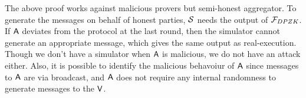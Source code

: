  The above proof works against malicious provers but semi-honest aggregator. To generate the messages on behalf of honest parties, $\mathcal{S}$ needs the output of $\mathcal{F}_{DPZK}$. If $\mathsf{A}$ deviates from the protocol at the last round, then the simulator cannot generate an appropriate message, which gives the same output as real-execution. Though we don't have a simulator when $\mathsf{A}$ is malicious, we do not have an attack either. Also, it is possible to identify the malicious behavoiur of $\mathsf{A}$ since messages to $\mathsf{A}$ are via broadcast, and $\mathsf{A}$ does not require any internal randomness to generate messages to the $\mathsf{V}$. 

